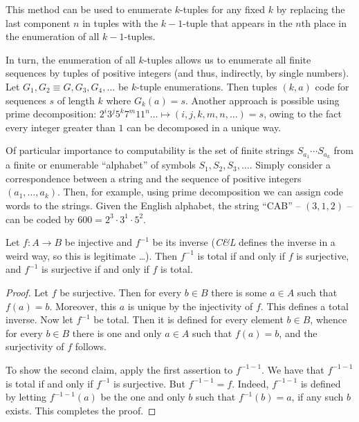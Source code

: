 This method can be used to enumerate $k$-tuples for any fixed $k$ by replacing the last component $n$ in tuples with the $k-1$-tuple that appears in the $n$th place in the enumeration of all $k-1$-tuples.

In turn, the enumeration of all $k$-tuples allows us to enumerate all finite sequences by tuples of positive integers (and thus, indirectly, by single numbers).
Let $G_1, G_2 \equiv G, G_3, G_4, \ldots$ be $k$-tuple enumerations.
Then tuples $(k, a)$ code for sequences $s$ of length $k$ where $G_k(a) = s$.
Another approach is possible using prime decomposition: $2^i3^j5^k7^m11^n\ldots \mapsto (i,j,k,m,n,\ldots) = s$, owing to the fact every integer greater than $1$ can be decomposed in a unique way.

Of particular importance to computability is the set of finite strings $S_{a_1} \cdots S_{a_k}$ from a finite or enumerable ``alphabet'' of symbols $S_1, S_2, S_3, \ldots$.
Simply consider a correspondence between a string and the sequence of positive integers $(a_1,\ldots,a_k)$.
Then, for example, using prime decomposition we can assign code words to the strings.
Given the English alphabet, the string ``CAB'' -- $(3,1,2)$ -- can be coded by $600 = 2^3 \cdot 3^1 \cdot 5^2$.


\begin{exercise}[1.1]
  Let $f\colon A \to B$ be injective and $f^{-1}$ be its inverse (\emph{C\&L} defines the inverse in a weird way, so this is legitimate \ldots).
  Then $f^{-1}$ is total if and only if $f$ is surjective, and $f^{-1}$ is surjective if and only if $f$ is total.
\end{exercise}
\begin{proof}
  Let $f$ be surjective.
  Then for every $b \in B$ there is some $a \in A$ such that $f(a) = b$.
  Moreover, this $a$ is unique by the injectivity of $f$.
  This defines a total inverse.
  Now let $f^{-1}$ be total.
  Then it is defined for every element $b \in B$, whence for every $b \in B$ there is one and only $a \in A$ such that $f(a) = b$, and the surjectivity of $f$ follows.

  To show the second claim, apply the first assertion to $f^{-1-1}$.
  We have that $f^{-1-1}$ is total if and only if $f^{-1}$ is surjective.
  But $f^{-1-1} = f$.
  \tk
  Indeed, $f^{-1-1}$ is defined by letting $f^{-1-1}(a)$ be the one and only $b$ such that $f^{-1}(b) = a$, if any such $b$ exists.
  This completes the proof.
\end{proof}

